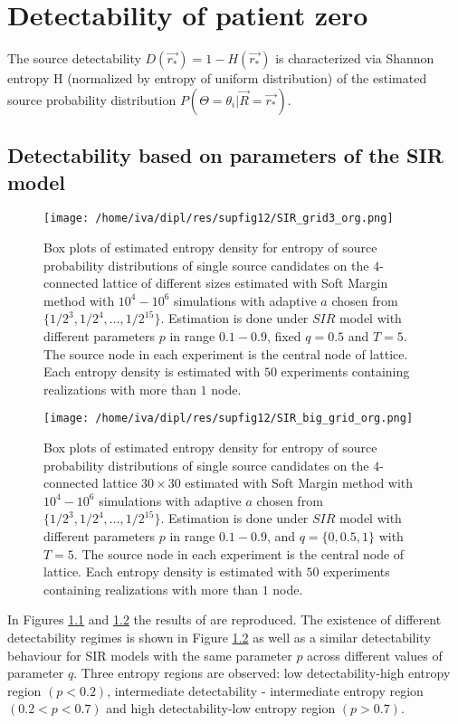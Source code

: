 \documentclass[times, utf8, diplomski]{fer}
\begin{document}
\chapter{Detectability of patient zero} 
\label{Det}

The source detectability $D(\vec{r_*}) = 1 - H(\vec{r_*})$ is characterized via Shannon entropy H (normalized by entropy of uniform distribution) of the estimated source probability distribution $P(\Theta = \theta_i |\vec{R} = \vec{r_*}).$

\section{Detectability based on parameters of the SIR model}
\begin{figure}[H]
\texttt{[image: /home/iva/dipl/res/supfig12/SIR\_grid3\_org.png]}
\caption{Box plots of estimated entropy density for entropy of source probability distributions of 
single source candidates on the $4$-connected lattice of different sizes estimated with Soft Margin method with $10^4 - 10^6$ simulations with adaptive $a$ chosen from $\{1/2^3, 1/2^4, \ldots, 1/2^{15}\}$. Estimation is done under $SIR$ model with different parameters $p$ in range $0.1 - 0.9$, fixed $q = 0.5$ and $T = 5$. The source node in each experiment is the central node of lattice. Each entropy density is estimated with $50$ experiments containing realizations with more than $1$ node.}
\label{network_size}
\end{figure}

\begin{figure}[H]
\texttt{[image: /home/iva/dipl/res/supfig12/SIR\_big\_grid\_org.png]}
\caption{Box plots of estimated entropy density for entropy of source probability distributions of 
single source candidates on the $4$-connected lattice $30 \times 30$ estimated with Soft Margin method with $10^4 - 10^6$ simulations with adaptive $a$ chosen from $\{1/2^3, 1/2^4, \ldots, 1/2^{15}\}$. Estimation is done under $SIR$ model with different parameters $p$ in range $0.1 - 0.9$, and $q = \{0, 0.5, 1\}$ with $T = 5$. The source node in each experiment is the central node of lattice. Each entropy density is estimated with $50$ experiments containing realizations with more than $1$ node.}
\label{entropy_zones}
\end{figure}

In Figures \ref{network_size} and \ref{entropy_zones} the results of \cite{Nino} are reproduced. The existence of different detectability regimes is shown in Figure \ref{entropy_zones} as well as a similar detectability behaviour for SIR models with the same parameter $p$ across different values of parameter $q$.  Three entropy regions are observed: low detectability-high entropy region $(p < 0.2)$, intermediate detectability - intermediate entropy region $(0.2 < p < 0.7)$ and high detectability-low entropy region $(p > 0.7)$.
\end{document}

